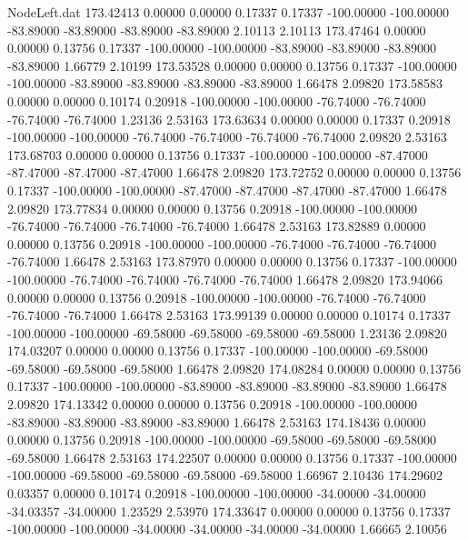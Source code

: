 \begin{filecontents}{NodeLeft.dat}
 173.42413    0.00000    0.00000     0.17337    0.17337 -100.00000 -100.00000  -83.89000  -83.89000  -83.89000  -83.89000    2.10113    2.10113
 173.47464    0.00000    0.00000     0.13756    0.17337 -100.00000 -100.00000  -83.89000  -83.89000  -83.89000  -83.89000    1.66779    2.10199
 173.53528    0.00000    0.00000     0.13756    0.17337 -100.00000 -100.00000  -83.89000  -83.89000  -83.89000  -83.89000    1.66478    2.09820
 173.58583    0.00000    0.00000     0.10174    0.20918 -100.00000 -100.00000  -76.74000  -76.74000  -76.74000  -76.74000    1.23136    2.53163
 173.63634    0.00000    0.00000     0.17337    0.20918 -100.00000 -100.00000  -76.74000  -76.74000  -76.74000  -76.74000    2.09820    2.53163
 173.68703    0.00000    0.00000     0.13756    0.17337 -100.00000 -100.00000  -87.47000  -87.47000  -87.47000  -87.47000    1.66478    2.09820
 173.72752    0.00000    0.00000     0.13756    0.17337 -100.00000 -100.00000  -87.47000  -87.47000  -87.47000  -87.47000    1.66478    2.09820
 173.77834    0.00000    0.00000     0.13756    0.20918 -100.00000 -100.00000  -76.74000  -76.74000  -76.74000  -76.74000    1.66478    2.53163
 173.82889    0.00000    0.00000     0.13756    0.20918 -100.00000 -100.00000  -76.74000  -76.74000  -76.74000  -76.74000    1.66478    2.53163
 173.87970    0.00000    0.00000     0.13756    0.17337 -100.00000 -100.00000  -76.74000  -76.74000  -76.74000  -76.74000    1.66478    2.09820
 173.94066    0.00000    0.00000     0.13756    0.20918 -100.00000 -100.00000  -76.74000  -76.74000  -76.74000  -76.74000    1.66478    2.53163
 173.99139    0.00000    0.00000     0.10174    0.17337 -100.00000 -100.00000  -69.58000  -69.58000  -69.58000  -69.58000    1.23136    2.09820
 174.03207    0.00000    0.00000     0.13756    0.17337 -100.00000 -100.00000  -69.58000  -69.58000  -69.58000  -69.58000    1.66478    2.09820
 174.08284    0.00000    0.00000     0.13756    0.17337 -100.00000 -100.00000  -83.89000  -83.89000  -83.89000  -83.89000    1.66478    2.09820
 174.13342    0.00000    0.00000     0.13756    0.20918 -100.00000 -100.00000  -83.89000  -83.89000  -83.89000  -83.89000    1.66478    2.53163
 174.18436    0.00000    0.00000     0.13756    0.20918 -100.00000 -100.00000  -69.58000  -69.58000  -69.58000  -69.58000    1.66478    2.53163
 174.22507    0.00000    0.00000     0.13756    0.17337 -100.00000 -100.00000  -69.58000  -69.58000  -69.58000  -69.58000    1.66967    2.10436
 174.29602    0.03357    0.00000     0.10174    0.20918 -100.00000 -100.00000  -34.00000  -34.00000  -34.03357  -34.00000    1.23529    2.53970
 174.33647    0.00000    0.00000     0.13756    0.17337 -100.00000 -100.00000  -34.00000  -34.00000  -34.00000  -34.00000    1.66665    2.10056

\end{filecontents}
